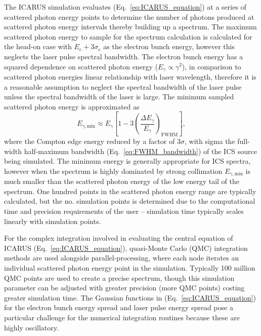 \documentclass[../main.tex]{subfiles}
\begin{document}
The \textsc{ICARUS} simulation evaluates (Eq.~\ref{eq:ICARUS_equation}) at a series of scattered photon energy points to determine the number of photons produced at scattered photon energy intervals thereby building up a spectrum. The maximum scattered photon energy to sample for the spectrum calculation is calculated for the head-on case with $E_{e}+3\sigma_{e}$ as the electron bunch energy, however this neglects the laser pulse spectral bandwidth. The electron bunch energy has a squared dependence on scattered photon energy ($E_{\gamma}\propto\gamma^{2}$), in comparison to scattered photon energies linear relationship with laser wavelength, therefore it is a reasonable assumption to neglect the spectral bandwidth of the laser pulse unless the spectral bandwidth of the laser is large. The minimum sampled scattered photon energy is approximated as
\begin{equation}
E_{\gamma,\mathrm{min}} \approx E_{\gamma}\left[1-3\left(\frac{\Delta E_{\gamma}}{E_{\gamma}}\right)_{\mathrm{FWHM}}\right],
\label{eq:ICARUS_minimum_energy}
\end{equation}
where the Compton edge energy reduced by a factor of $3\sigma$, with sigma the full-width half-maximum bandwidth (Eq.~\ref{eq:FWHM_bandwidth}) of the ICS source being simulated. The minimum energy is generally appropriate for ICS spectra, however when the spectrum is highly dominated by strong collimation $E_{\gamma,\mathrm{min}}$ is much smaller than the scattered photon energy of the low energy tail of the spectrum. One hundred points in the scattered photon energy range are typically calculated, but the no. simulation points is determined due to the computational time and precision requirements of the user -- simulation time typically scales linearly with simulation points.  

For the complex integration involved in evaluating the central equation of \textsc{ICARUS} (Eq.~\ref{eq:ICARUS_equation}), quasi-Monte Carlo (QMC) integration methods are used alongside parallel-processing, where each node iterates an individual scattered photon energy point in the simulation. Typically 100 million QMC points are used to create a precise spectrum, though this simulation parameter can be adjusted with greater precision (more QMC points) costing greater simulation time. The Gaussian functions in (Eq.~\ref{eq:ICARUS_equation}) for the electron bunch energy spread and laser pulse energy spread pose a particular challenge for the numerical integration routines because these are highly oscillatory. 
\end{document}

